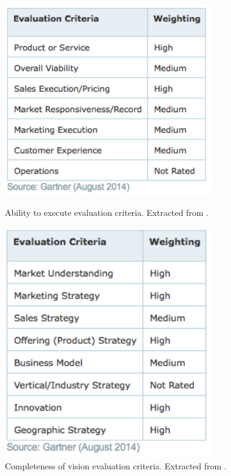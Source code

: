 \begin{figure}[h!]
\begin{minipage}[h]{0.45\linewidth}
\centering
\includegraphics[width=0.8\textwidth]{img/AbilityToExecuteITSM.png}
\caption{Ability to execute evaluation criteria. Extracted from \cite{magicQuadrantITSM}.}
\label{fig:figure1}
\end{minipage}
\hspace{0.5cm}
\begin{minipage}[h!]{0.45\linewidth}
\centering
\includegraphics[width=0.8\textwidth]{img/CompletenessOfVisionITSM.png}
\caption{Completeness of vision evaluation criteria. Extracted from \cite{magicQuadrantITSM}.}
\label{fig:figure2}
\end{minipage}
\end{figure}


